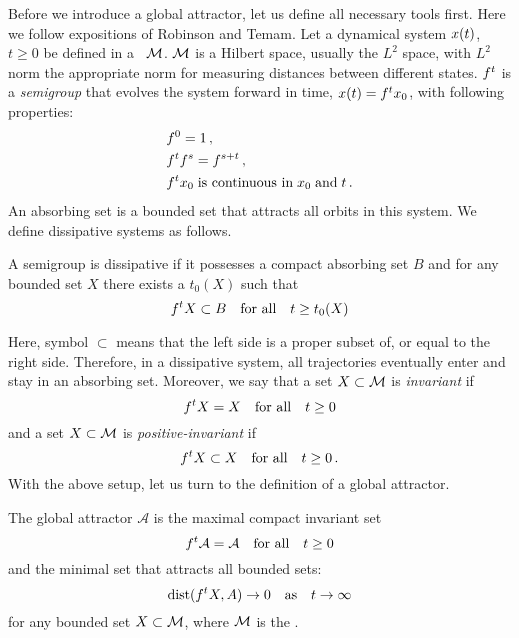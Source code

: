 Before we introduce a global attractor, let us define all necessary
tools first. Here we follow expositions of
Robinson and Temam.
Let a dynamical system $x(t)$, $t\ge 0$
be defined in a \statesp\ $\mathcal{M}$. $\mathcal{M}$ is a Hilbert space, usually
the $L^2$ space, with $L^2$ norm the appropriate norm for measuring
distances between different states.
${f^{t}}$ is a \emph{semigroup} that
evolves the system forward in time, $x(t) = {f^{t}}x_0$, with following
properties:
\begin{align*}
  & {f^{0}} = 1 \,, \\
  & {f^{t}}{f^{s}} = {f^{s+t}} \,, \\
  & {f^{t}}x_0 \; \text{is continuous in} \; x_0\; \text{and}\; t
    \,.
\end{align*}
An absorbing set is a bounded set that attracts all orbits in this
system. We define dissipative systems as follows.
\begin{definition}
  A semigroup is dissipative if it possesses a compact
  absorbing set $B$ and for any bounded set $X$ there exists
  a $t_0(X)$ such that
  \[
    {f^{t}}X \subset B\quad \text{for all} \quad t \ge t_0(X)
  \]
  \label{def:dissi}
\end{definition}
Here, symbol $\subset$ means that the left side is a proper subset of, or equal to
the right side.
Therefore,  in a dissipative system,
all trajectories eventually enter and stay in
an absorbing set. Moreover, we say that
a set $X\subset \mathcal{M}$ is \emph{invariant} if
\begin{equation}
  \label{eq:invariant}
  {f^{t}}X = X  \quad \text{for all} \quad t \ge 0
\end{equation}
and a set $X\subset \mathcal{M}$ is \emph{positive-invariant} if
\begin{equation}
  \label{eq:pos_invar}
  {f^{t}}X \subset X  \quad \text{for all} \quad t \ge 0
  \,.
\end{equation}
With the above setup, let us turn to the definition of a global
attractor.
\begin{definition}
  The global attractor $\mathcal{A}$ is
  the maximal compact invariant set
  \begin{equation}
    {f^{t}}\mathcal{A} = \mathcal{A} \quad \text{for all} \quad
    t \ge 0
    \label{eq:ga1}
  \end{equation}
  and the minimal set that attracts all bounded sets:
  \begin{equation}
    \operatorname{dist}({f^{t}}X, A) \to 0 \quad \text{as} \quad t\to\infty
    \label{eq:ga2}
  \end{equation}
  for any bounded set $X\subset \mathcal{M}$, where $\mathcal{M}$ is the \statesp.
\end{definition}
